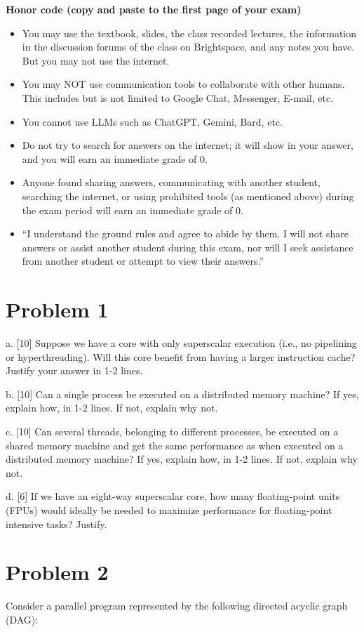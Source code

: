 \documentclass{article}
\begin{document}
\textbf{Honor code (copy and paste to the first page of your exam)}

\begin{itemize}
    \item You may use the textbook, slides, the class recorded lectures, the information in the discussion forums of the class on Brightspace, and any notes you have. But you may not use the internet.
    \item You may NOT use communication tools to collaborate with other humans. This includes but is not limited to Google Chat, Messenger, E-mail, etc.
    \item You cannot use LLMs such as ChatGPT, Gemini, Bard, etc.
    \item Do not try to search for answers on the internet; it will show in your answer, and you will earn an immediate grade of 0.
    \item Anyone found sharing answers, communicating with another student, searching the internet, or using prohibited tools (as mentioned above) during the exam period will earn an immediate grade of 0.
    \item “I understand the ground rules and agree to abide by them. I will not share answers or assist another student during this exam, nor will I seek assistance from another student or attempt to view their answers.”
\end{itemize}

\section*{Problem 1}
a. [10]  Suppose we have a core with only superscalar execution (i.e., no pipelining or hyperthreading). Will this core benefit from having a larger instruction cache? Justify your answer in 1-2 lines.

b. [10] Can a single process be executed on a distributed memory machine? If yes, explain how, in 1-2 lines. If not, explain why not.

c. [10] Can several threads, belonging to different processes, be executed on a shared memory machine and get the same performance as when executed on a distributed memory machine?  If yes, explain how, in 1-2 lines. If not, explain why not.

d. [6] If we have an eight-way superscalar core, how many floating-point units (FPUs) would ideally be needed to maximize performance for floating-point intensive tasks? Justify.


\section*{Problem 2}
Consider a parallel program represented by the following directed acyclic graph (DAG):
\end{document}
